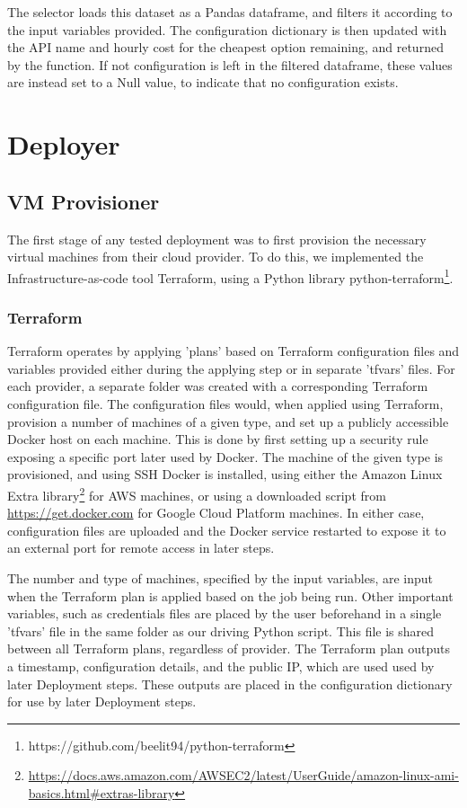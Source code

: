 \documentclass{report}
\begin{document}
The selector loads this dataset as a Pandas dataframe, and filters it according to the input variables provided. The configuration dictionary is then updated with the API name and hourly cost for the cheapest option remaining, and returned by the function. If not configuration is left in the filtered dataframe, these values are instead set to a Null value, to indicate that no configuration exists.

\section{Deployer}
\subsection{VM Provisioner}
The first stage of any tested deployment was to first provision the necessary virtual machines from their cloud provider. To do this, we implemented the Infrastructure-as-code tool Terraform, using a Python library python-terraform\footnote{https://github.com/beelit94/python-terraform}. 
\subsubsection{Terraform}
Terraform operates by applying 'plans' based on Terraform configuration files and variables provided either during the applying step or in separate 'tfvars' files. For each provider, a separate folder was created with a corresponding Terraform configuration file. The configuration files would, when applied using Terraform, provision a number of machines of a given type, and set up a publicly accessible Docker host on each machine. This is done by first setting up a security rule exposing a specific port later used by Docker. The machine of the given type is provisioned, and using SSH Docker is installed, using either the Amazon Linux Extra library\footnote{\url{https://docs.aws.amazon.com/AWSEC2/latest/UserGuide/amazon-linux-ami-basics.html\#extras-library}} for AWS machines, or using a downloaded script from \url{https://get.docker.com} for Google Cloud Platform machines. In either case, configuration files are uploaded and the Docker service restarted to expose it to an external port for remote access in later steps.

The number and type of machines, specified by the input variables, are input when the Terraform plan is applied based on the job being run. Other important variables, such as credentials files are placed by the user beforehand in a single 'tfvars' file in the same folder as our driving Python script. This file is shared between all Terraform plans, regardless of provider. The Terraform plan outputs a timestamp, configuration details, and the public IP, which are used used by later Deployment steps. These outputs are placed in the configuration dictionary for use by later Deployment steps.
\end{document}
